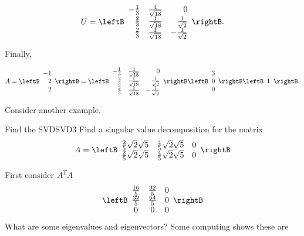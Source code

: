 \begin{solution}
\[ U = \leftB\begin{array}{rrr} -\frac{1}{3} & \frac{4}{\sqrt{18}} & 0 \\
\frac{2}{3} & \frac{1}{\sqrt{18}} & \frac{1}{\sqrt 2} \\
\frac{2}{3} & \frac{1}{\sqrt{18}} & -\frac{1}{\sqrt 2} \end{array}\rightB.\]

Finally,

\[ A = 
\leftB\begin{array}{r} -1 \\ 2 \\ 2 \end{array}\rightB
=
\leftB\begin{array}{rrr} -\frac{1}{3} & \frac{4}{\sqrt{18}} & 0 \\
\frac{2}{3} & \frac{1}{\sqrt{18}} & \frac{1}{\sqrt 2} \\
\frac{2}{3} & \frac{1}{\sqrt{18}} & -\frac{1}{\sqrt 2} \end{array}\rightB
\leftB\begin{array}{r} 3 \\ 0 \\ 0 \end{array}\rightB
\leftB\begin{array}{r} 1 \end{array}\rightB.\]

\end{solution}

Consider another example.

\begin{example}{Find the SVD}{SVD3}
Find a singular value decomposition for the matrix 
\begin{equation*}
A= \leftB  
\begin{array}{ccc}
\frac{2}{5}\sqrt{2}\sqrt{5} & \frac{4}{5}\sqrt{2}\sqrt{5} & 0 \\ 
\frac{2}{5}\sqrt{2}\sqrt{5} & \frac{4}{5}\sqrt{2}\sqrt{5} & 0
\end{array}
\rightB
\end{equation*}
\end{example}

First consider $A^TA$
\begin{equation*}
\leftB 
\begin{array}{ccc}
\frac{16}{5} & \frac{32}{5} & 0 \\ 
\frac{32}{5} & \frac{64}{5} & 0 \\ 
0 & 0 & 0
\end{array}
\rightB
\end{equation*}
What are some eigenvalues and eigenvectors? Some computing shows these are

